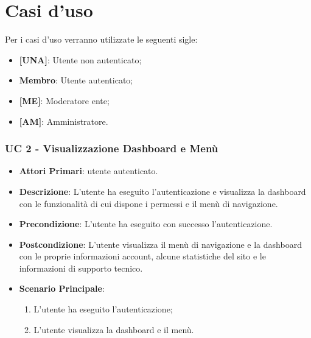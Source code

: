 \section{Casi d'uso}
	Per i casi d'uso verranno utilizzate le seguenti sigle:
	\begin{itemize}
		\item \textbf{[UNA]}: Utente non autenticato;
		\item \textbf{Membro}: Utente autenticato;
		\item \textbf{[ME]}: Moderatore ente;
		\item \textbf{[AM]}: Amministratore.
	\end{itemize}

		

		
		

		\subsubsection{UC 2 - Visualizzazione Dashboard e Menù}
		
		\begin{itemize}
			\item \textbf{Attori Primari}: utente autenticato.
			\item \textbf{Descrizione}: L'utente ha eseguito l'autenticazione e visualizza la dashboard con le funzionalità di cui dispone i permessi e il menù di navigazione.
			\item \textbf{Precondizione}: L'utente ha eseguito con successo l'autenticazione.
			\item \textbf{Postcondizione}: L'utente visualizza il menù di navigazione e la dashboard con le proprie informazioni account, alcune statistiche del sito e le informazioni di supporto tecnico.
			\item \textbf{Scenario Principale}:
			\begin{enumerate}
				\item L'utente ha eseguito l'autenticazione;
				\item L'utente visualizza la dashboard e il menù.
			\end{enumerate}	
		\end{itemize}


